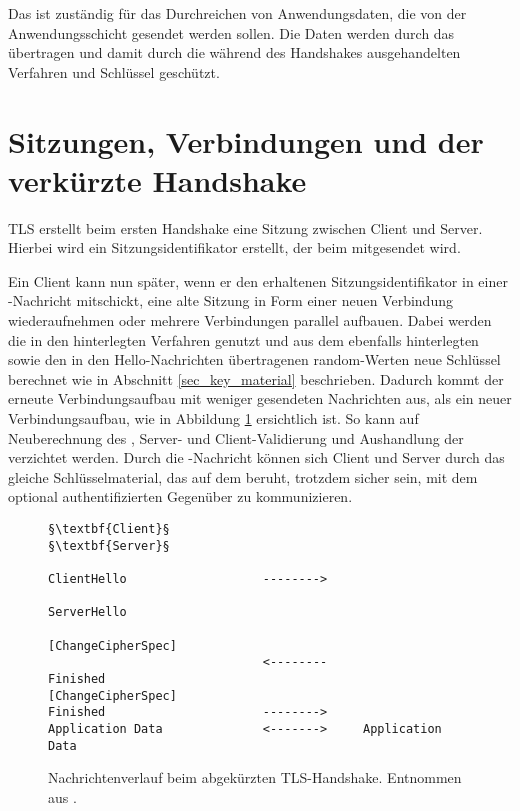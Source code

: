 Das \applicationdataprotocol{} ist zuständig für das Durchreichen von Anwendungsdaten, die von der Anwendungsschicht gesendet werden sollen. Die Daten werden durch das \recordprotocol{} übertragen und damit durch die während des Handshakes ausgehandelten Verfahren und Schlüssel geschützt.

\section{Sitzungen, Verbindungen und der verkürzte Handshake}
\label{sec_session_connection}


TLS erstellt beim ersten Handshake eine Sitzung zwischen Client und Server. Hierbei wird ein Sitzungsidentifikator erstellt, der beim \serverhello{} mitgesendet wird. 

Ein Client kann nun später, wenn er den erhaltenen Sitzungsidentifikator in einer \clienthello{}-Nachricht mitschickt, eine alte Sitzung in Form einer neuen Verbindung wiederaufnehmen oder mehrere Verbindungen parallel aufbauen. Dabei werden die in den  hinterlegten Verfahren genutzt und aus dem ebenfalls hinterlegten \mastersecret{} sowie den in den Hello-Nachrichten übertragenen random-Werten neue Schlüssel berechnet wie in Abschnitt \ref{sec_key_material} beschrieben. Dadurch kommt der erneute Verbindungsaufbau mit weniger gesendeten Nachrichten aus, als ein neuer Verbindungsaufbau, wie in Abbildung \ref{fig_abbreviated_handshake} ersichtlich ist. So kann auf Neuberechnung des \mastersecret{}, Server- und Client-Validierung und Aushandlung der \ciphersuite{} verzichtet werden. Durch die \finished{}-Nachricht können sich Client und Server durch das gleiche Schlüsselmaterial, das auf dem \mastersecret{} beruht, trotzdem sicher sein, mit dem optional authentifizierten Gegenüber zu kommunizieren.

\lstset{
	style=default,
	frame=single
}
\begin{figure}[H]
	\centering
	\begin{lstlisting}
§\textbf{Client}§                                                §\textbf{Server}§

ClientHello                   -------->
                                                 ServerHello
                                          [ChangeCipherSpec]
                              <--------             Finished
[ChangeCipherSpec]
Finished                      -------->
Application Data              <------->     Application Data
	\end{lstlisting}
	\caption{Nachrichtenverlauf beim abgekürzten TLS-Handshake. Entnommen aus \cite{tls12}.}
	\label{fig_abbreviated_handshake}
\end{figure}
\lstset{style=tls}


